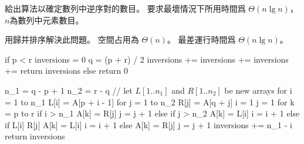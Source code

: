 \item 給出算法以確定數列中逆序對的數目。
要求最壞情況下所用時間爲 $\Theta(n\lg n)$，
$n$為數列中元素數目。

\startANSWER
用歸并排序解決此問題。
空間占用為 $\Theta(n)$。
最差運行時間爲 $\Theta(n\lg n)$。

\startCLRSCODE
if p < r
	inversions = 0
	q = (p + r) / 2
	inversions += 
	inversions += 
	inversions += 
	return inversions
else
	return 0
\stopCLRSCODE

\startCLRSCODE
n_1 = q - p + 1
n_2 = r - q
// let $L[1..n_1]$ and $R[1..n_2]$ be new arrays
for i = 1 to n_1
	L[i] = A[p + i - 1]
for j = 1 to n_2
	R[j] = A[q + j]
i = 1
j = 1
for k = p to r
	if i > n_1
		A[k] = R[j]
		j = j + 1
	else if j > n_2
		A[k] = L[i]
		i = i + 1
	else if L[i] \le R[j]
		A[k] = L[i]
		i = i + 1
	else
		A[k] = R[j]
		j = j + 1
		inversions += n_1 - i
return inversions
\stopCLRSCODE
\stopANSWER

\stopigBase
\stopPROBLEM

\stopsubject
